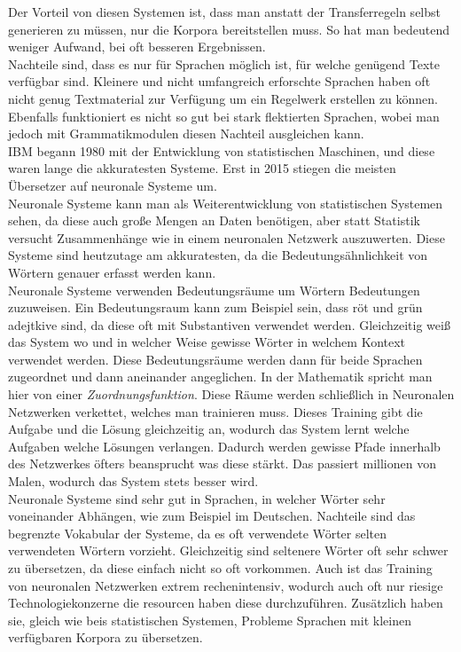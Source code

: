 \documentclass{article}
\begin{document}
	Der Vorteil von diesen Systemen ist, dass man anstatt der Transferregeln selbst generieren zu müssen, nur die Korpora bereitstellen muss. So hat man bedeutend weniger Aufwand, bei oft besseren Ergebnissen. \\
	Nachteile sind, dass es nur für Sprachen möglich ist, für welche genügend Texte verfügbar sind. Kleinere und nicht umfangreich erforschte Sprachen haben oft nicht genug Textmaterial zur Verfügung um ein Regelwerk erstellen zu können. Ebenfalls funktioniert es nicht so gut bei stark flektierten Sprachen, wobei man jedoch mit Grammatikmodulen diesen Nachteil ausgleichen kann. \\
	IBM begann 1980 mit der Entwicklung von statistischen Maschinen, und diese waren lange die akkuratesten Systeme. Erst in 2015 stiegen die meisten Übersetzer auf neuronale Systeme um. \\
	Neuronale Systeme kann man als Weiterentwicklung von statistischen Systemen sehen, da diese auch große Mengen an Daten benötigen, aber statt Statistik versucht Zusammenhänge wie in einem neuronalen Netzwerk auszuwerten. Diese Systeme sind heutzutage am akkuratesten, da die Bedeutungsähnlichkeit von Wörtern genauer erfasst werden kann. \\
	Neuronale Systeme verwenden Bedeutungsräume um Wörtern Bedeutungen zuzuweisen. Ein Bedeutungsraum kann zum Beispiel sein, dass röt und grün adejtkive sind, da diese oft mit Substantiven verwendet werden. Gleichzeitig weiß das System wo und in welcher Weise gewisse Wörter in welchem Kontext verwendet werden. Diese Bedeutungsräume werden dann für beide Sprachen zugeordnet und dann aneinander angeglichen. In der Mathematik spricht man hier von einer \textit{Zuordnungsfunktion}. Diese Räume werden schließlich in Neuronalen Netzwerken verkettet, welches man trainieren muss. Dieses Training gibt die Aufgabe und die Lösung gleichzeitig an, wodurch das System lernt welche Aufgaben welche Lösungen verlangen. Dadurch werden gewisse Pfade innerhalb des Netzwerkes öfters beansprucht was diese stärkt. Das passiert millionen von Malen, wodurch das System stets besser wird. \\
	Neuronale Systeme sind sehr gut in Sprachen, in welcher Wörter sehr voneinander Abhängen, wie zum Beispiel im Deutschen. Nachteile sind das begrenzte Vokabular der Systeme, da es oft verwendete Wörter selten verwendeten Wörtern vorzieht. Gleichzeitig sind seltenere Wörter oft sehr schwer zu übersetzen, da diese einfach nicht so oft vorkommen. Auch ist das Training von neuronalen Netzwerken extrem rechenintensiv, wodurch auch oft nur riesige Technologiekonzerne die resourcen haben diese durchzuführen. Zusätzlich haben sie, gleich wie beis statistischen Systemen, Probleme Sprachen mit kleinen verfügbaren Korpora zu übersetzen. \\
\end{document}
